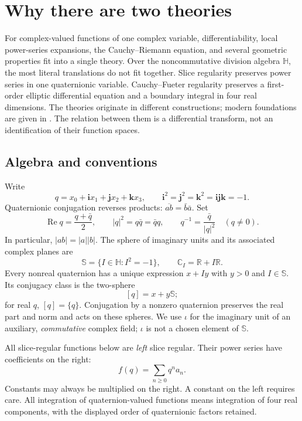 \documentclass[11pt,a4paper]{article}
\numberwithin{equation}{section}
\theoremstyle{definition}
\theoremstyle{remark}
\newcommand{\R}{\mathbb R}
\newcommand{\C}{\mathbb C}
\newcommand{\HH}{\mathbb H}
\newcommand{\SSS}{\mathbb S}
\newcommand{\ii}{\mathbf i}
\newcommand{\jj}{\mathbf j}
\newcommand{\kk}{\mathbf k}
\newcommand{\Rea}{\operatorname{Re}}
\begin{document}
\section{Why there are two theories}
\label{sec:intro}
For complex-valued functions of one complex variable, differentiability, local
power-series expansions, the Cauchy--Riemann equation, and several geometric
properties fit into a single theory. Over the noncommutative division algebra
$\HH$, the most literal translations do not fit together. Slice regularity
preserves power series in one quaternionic variable. Cauchy--Fueter regularity
preserves a first-order elliptic differential equation and a boundary integral
in four real dimensions. The theories originate in different constructions;
modern foundations are given in
\cite{GS,GP,CGS,Sudbery}. The relation between them is a differential transform,
not an identification of their function spaces.

\subsection{Algebra and conventions}
Write
\[
 q=x_0+\ii x_1+\jj x_2+\kk x_3,
 \qquad \ii^2=\jj^2=\kk^2=\ii\jj\kk=-1.
\]
Quaternionic conjugation reverses products:
$\overline{ab}=\bar b\bar a$. Set
\[
 \Rea q=\frac{q+\bar q}{2},\qquad
 |q|^2=q\bar q=\bar q q,\qquad q^{-1}=\frac{\bar q}{|q|^2}\quad(q\ne0).
\]
In particular, $|ab|=|a||b|$. The sphere of imaginary units and its associated
complex planes are
\[
 \SSS=\{I\in\HH:I^2=-1\},\qquad \C_I=\R+I\R.
\]
Every nonreal quaternion has a unique expression $x+Iy$ with $y>0$ and
$I\in\SSS$. Its conjugacy class is the two-sphere
\[
 [q]=x+y\SSS;
\]
for real $q$, $[q]=\{q\}$. Conjugation by a nonzero quaternion preserves the real
part and norm and acts on these spheres. We use $\iota$ for the imaginary unit of
an auxiliary, \emph{commutative} complex field; $\iota$ is not a chosen element of
$\SSS$.

All slice-regular functions below are \emph{left} slice regular. Their power
series have coefficients on the right:
\[
 f(q)=\sum_{n\ge0}q^n a_n.
\]
Constants may always be multiplied on the right. A constant on the left requires
care. All integration of quaternion-valued functions means integration of four
real components, with the displayed order of quaternionic factors retained.
\end{document}
